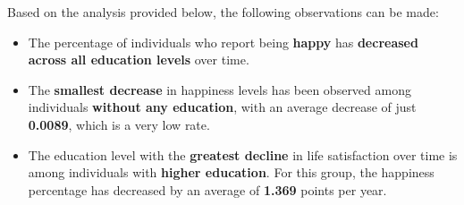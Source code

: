 \documentclass[
  11pt,
  a4paper,
  DIV=11,
  numbers=noendperiod]{scrartcl}
\begin{document}
Based on the analysis provided below, the following observations can be
made:

\begin{itemize}
\item
  The percentage of individuals who report being {\textbf{happy}} has
  {\textbf{decreased across all education levels}} over time.
\item
  The {\textbf{smallest decrease}} in happiness levels has been observed
  among individuals {\textbf{without any education}}, with an average
  decrease of just {\textbf{0.0089}}, which is a very low rate.
\item
  The education level with the {\textbf{greatest decline}} in life
  satisfaction over time is among individuals with {\textbf{higher
  education}}. For this group, the happiness percentage has decreased by
  an average of {\textbf{1.369}} points per year.
\end{itemize}
\end{document}
